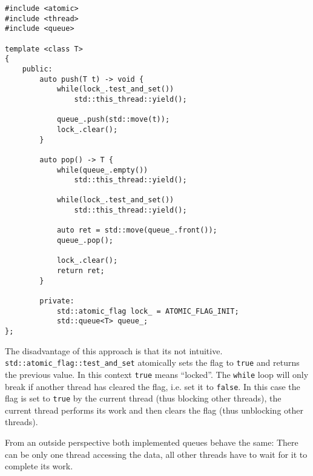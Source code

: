 \begin{lstlisting}
#include <atomic>
#include <thread>
#include <queue>

template <class T>
{
    public:
        auto push(T t) -> void {
            while(lock_.test_and_set())
                std::this_thread::yield();
                
            queue_.push(std::move(t));
            lock_.clear();
        }
        
        auto pop() -> T {
            while(queue_.empty())
                std::this_thread::yield();
                
            while(lock_.test_and_set())
                std::this_thread::yield();
                
            auto ret = std::move(queue_.front());
            queue_.pop();
            
            lock_.clear();
            return ret;
        }
        
        private:
            std::atomic_flag lock_ = ATOMIC_FLAG_INIT;
            std::queue<T> queue_;
};
\end{lstlisting}

The disadvantage of this approach is that its not intuitive. \texttt{std::atomic\_flag::test\_and\_set} atomically sets the flag to \texttt{true} and returns the previous value. In this context \texttt{true} means ``locked''. The \texttt{while} loop will only break if another thread has cleared the flag, i.e. set it to \texttt{false}. In this case the flag is set to \texttt{true} by the current thread (thus blocking other threads), the current thread performs its work and then clears the flag (thus unblocking other threads).

From an outside perspective both implemented queues behave the same: There can be only one thread accessing the data, all  other threads have to wait for it to complete its work.